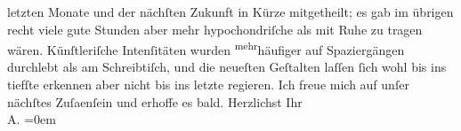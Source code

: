 \begin{ledgroupsized}[t]{13cm}
               letzten Monate und der nächſten Zukunft in Kürze mitgetheilt; es gab im übrigen recht
               viele gute Stunden aber mehr hypochondriſche als mit Ruhe zu tragen wären.
               Künſtleriſche Intenſitäten wurden \substVorne{}\textsuperscript{mehr}\substDazwischen{}häufiger\substHinten{} auf Spaziergängen durchlebt als am Schreibtiſch, und die neueſten Geſtalten
               laſſen ſich wohl bis ins tiefſte erkennen aber nicht bis ins letzte regieren. Ich
               freue mich auf unſer nächſtes Zuſa{\geminationm}enſein und erhoffe es
               bald.\pend
           \pstart
           Herzlichst Ihr{\\[\baselineskip]}\spacefill\mbox{A.}\pend
           \leftskip=0em{}
         
         \endnumbering{}\end{ledgroupsized}  \newcommand{\dateiname}{L01625}\newcommand{\titel}{Arthur Schnitzler an Hugo von Hofmannsthal, 8. 9. 1906}\newcommand{\editorInnen}{Martin Anton Müller und Gerd-Hermann Susen}
      